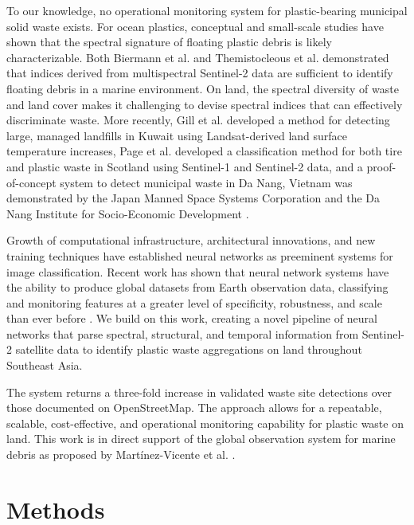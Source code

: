 \documentclass[10pt,letterpaper]{article}
\begin{document}
To our knowledge, no operational monitoring system for plastic-bearing municipal solid waste exists. For ocean plastics, conceptual \cite{goddijn2018concept} and small-scale \cite{acuna2018anthropogenic} studies have shown that the spectral signature of floating plastic debris is likely characterizable. Both Biermann et al. \cite{biermann2020finding} and Themistocleous et al. \cite{themistocleous2020investigating} demonstrated that indices derived from multispectral Sentinel-2 data are sufficient to identify floating debris in a marine environment. On land, the spectral diversity of waste and land cover makes it challenging to devise spectral indices that can effectively discriminate waste. More recently, Gill et al. \cite{gill2019detection} developed a method for detecting large, managed landfills in Kuwait using Landsat-derived land surface temperature increases, Page et al. \cite{page2020identification} developed a classification method for both tire and plastic waste in Scotland using Sentinel-1 and Sentinel-2 data, and a proof-of-concept system to detect municipal waste in Da Nang, Vietnam was demonstrated by the Japan Manned Space Systems Corporation and the Da Nang Institute for Socio-Economic Development \cite{nguyen_pham_2022}.

Growth of computational infrastructure, architectural innovations, and new training techniques have established neural networks as preeminent systems for image classification. Recent work has shown that neural network systems have the ability to produce global datasets from Earth observation data, classifying and monitoring features at a greater level of specificity, robustness, and scale than ever before \cite{li2020global}\cite{bonafilia2019building}\cite{kruitwagen2021global}\cite{9553499}. We build on this work, creating a novel pipeline of neural networks that parse spectral, structural, and temporal information from Sentinel-2 satellite data to identify plastic waste aggregations on land throughout Southeast Asia.

The system returns a three-fold increase in validated waste site detections over those documented on OpenStreetMap. The approach allows for a repeatable, scalable, cost-effective, and operational monitoring capability for plastic waste on land. This work is in direct support of the global observation system for marine debris as proposed by Martínez-Vicente et al. \cite{martinez2019measuring}.

\section*{Methods}
\end{document}
